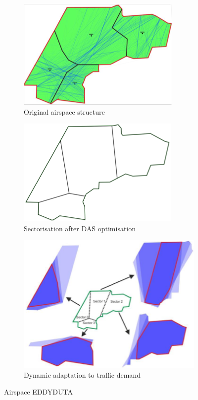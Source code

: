 \begin{figure}[!ht]
    \centering
    \begin{subfigure}{.45\textwidth}
        \centering
        \includegraphics[width=.7\textwidth]{img/airspace.png}
        \caption{Original airspace structure}
        \label{airspace-normal}
    \end{subfigure}
    \begin{subfigure}{.45\textwidth}
        \centering
        \includegraphics[width=.7\textwidth]{img/airspace-das.png}
        \caption{Sectorisation after \gls{DAS} optimisation}
        \label{airspace-das}
    \end{subfigure}

    \begin{subfigure}{\textwidth}
        \centering
        \includegraphics[width=.5\textwidth]{img/airspace-dynamic.png}
        \caption{Dynamic adaptation to traffic demand}
        \label{airspace-dynamic}
    \end{subfigure}

    \caption{Airspace EDDYDUTA \cite{Schultz_2018}}
    \label{airspace}
\end{figure}

